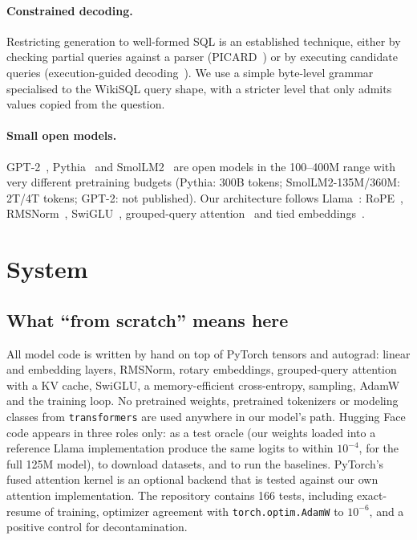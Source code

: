 \documentclass[11pt]{article}
\begin{document}
\paragraph{Constrained decoding.} Restricting generation to well-formed SQL is an established technique, either by checking partial queries against a parser (PICARD~\cite{scholak2021picard}) or by executing candidate queries (execution-guided decoding~\cite{wang2018execution}). We use a simple byte-level grammar specialised to the WikiSQL query shape, with a stricter level that only admits values copied from the question.

\paragraph{Small open models.} GPT-2~\cite{radford2019gpt2}, Pythia~\cite{biderman2023pythia} and SmolLM2~\cite{benallal2025smollm2} are open models in the 100--400M range with very different pretraining budgets (Pythia: 300B tokens; SmolLM2-135M/360M: 2T/4T tokens; GPT-2: not published). Our architecture follows Llama~\cite{touvron2023llama}: RoPE~\cite{su2021roformer}, RMSNorm~\cite{zhang2019rmsnorm}, SwiGLU~\cite{shazeer2020glu}, grouped-query attention~\cite{ainslie2023gqa} and tied embeddings~\cite{press2017tying}.

\section{System}
\label{sec:system}

\subsection{What ``from scratch'' means here}

All model code is written by hand on top of PyTorch tensors and autograd: linear and embedding layers, RMSNorm, rotary embeddings, grouped-query attention with a KV cache, SwiGLU, a memory-efficient cross-entropy, sampling, AdamW and the training loop. No pretrained weights, pretrained tokenizers or modeling classes from \texttt{transformers} are used anywhere in our model's path. Hugging Face code appears in three roles only: as a test oracle (our weights loaded into a reference Llama implementation produce the same logits to within $10^{-4}$, for the full 125M model), to download datasets, and to run the baselines. PyTorch's fused attention kernel is an optional backend that is tested against our own attention implementation. The repository contains 166 tests, including exact-resume of training, optimizer agreement with \texttt{torch.optim.AdamW} to $10^{-6}$, and a positive control for decontamination.
\end{document}
